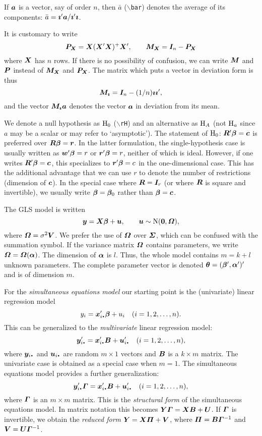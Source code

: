 \documentclass[11pt,dvips,a4paper]{article}
\newcommand{\type}[1]{{\tt$\backslash$#1}}
\begin{document}
If $\bm a$ is a vector, say of order $n$,
then $\bar{a}$ (\type{bar})
denotes the average of its components:
$\bar{a}=\bm\imath'\bm a/\bm\imath'\bm\imath$.

It is customary to write
$$
\bm P_{\bm X}=\bm X(\bm X'\bm X)^+\bm X',\qquad
\bm M_{\bm X}=\bm I_n - \bm P_{\bm X}
$$
where $\bm X$ has $n$ rows. If there is no possibility of confusion,
we can write $\bm M$ and $\bm P$ instead of $\bm M_{\bm X}$ and $\bm P_{\bm X}$.
The matrix which puts a vector in deviation form is thus
$$
\bm M_{\bm\imath}=\bm I_n-(1/n)\bm\imath\bm\imath',
$$
and the vector $\bm M_{\bm\imath}\bm a$
denotes the vector $\bm a$ in deviation from its mean.

We denote a null hypothesis as $\mathrm{H}_0$ (\type{rH}) and an alternative
as $\mathrm{H}_A$ (not $\mathrm{H}_a$ since $a$ may be a scalar
or may refer to `asymptotic').
The statement of $\mathrm{H}_0$:
$\bm R'\bm \beta=\bm c$ is preferred over
$\bm R\bm \beta=\bm r$. In the latter formulation,
the single-hypothesis case is usually written as
$\bm w'\bm \beta=r$ or $\bm r'\bm \beta=r$, neither of which is ideal.
However, if one writes
$\bm R'\bm \beta=\bm c$, this specializes to $\bm r'\bm \beta=c$
in the one-dimensional case.
This has the additional advantage that we can use $r$ to denote the
number of restrictions (dimension of $\bm c$).
In the special case where $\bm R=\bm I_r$ (or where $\bm R$ is square and
invertible), we usually write $\bm \beta=\bm \beta_0$ rather than
$\bm \beta=\bm c$.

The GLS model is written
$$
\bm y=\bm X\bm \beta + \bm u,\qquad \bm u\sim \text{N}(\boldsymbol{0},\bm \varOmega),
$$
where $\bm \varOmega=\sigma^2\bm V$.
We prefer the use of $\bm \varOmega$ over $\bm \varSigma$,
which can be confused with the summation symbol.
If the variance matrix $\bm \varOmega$ contains parameters, we write
$\bm \varOmega=\bm \varOmega(\bm \alpha)$. The dimension of $\bm \alpha$ is $l$.
Thus, the whole model contains $m=k+l$ unknown parameters.
The complete parameter vector is denoted $\bm \theta=(\bm \beta',\bm \alpha')'$
and is of dimension $m$.

For the {\it simultaneous equations model\/} our starting point is the
(univariate) linear regression model
$$
y_i = \vx'_{i\bcdot}\vbeta + u_i\quad (i=1,2,\dots,n).
$$
This can be generalized to the {\it multivariate\/} linear regression
model:
$$
\vy'_{i\bcdot} = \vx'_{i\bcdot}\mB + \vu'_{i\bcdot}\quad (i=1,2,\dots,n),
$$
where $\vy_{i\bcdot}$ and $\vu_{i\bcdot}$ are random $m\times 1$ vectors
and $\bm B$ is a $k\times m$ matrix.
The univariate case is obtained as a special case when $m=1$.
The simultaneous equations model provides a further generalization:
$$
\vy'_{i\bcdot}\mGamma = \vx'_{i\bcdot}\mB + \vu'_{i\bcdot}\quad (i=1,2,\dots,n),
$$
where $\bm \varGamma$ is an $m\times m$ matrix.
This is the {\it structural form\/} of the simultaneous equations model.
In matrix notation this becomes
$\bm Y\bm \varGamma = \bm X\bm B + \bm U$. If $\bm \varGamma$ is invertible, we obtain
the {\it reduced form\/}
$\bm Y=\bm X\bm \varPi + \bm V$, where
$\bm \varPi=\bm B\bm \varGamma^{-1}$ and $\bm V=\bm U\bm \varGamma^{-1}$.
%
\end{document}
